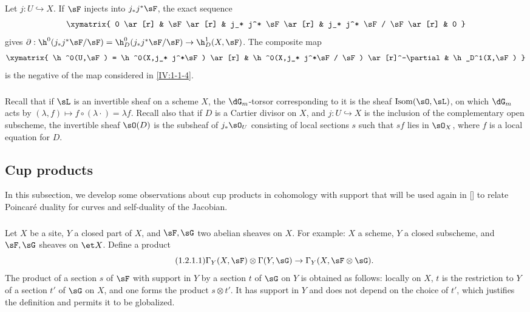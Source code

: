 \marginpar{!}Let $j:U\hookrightarrow X$. If $\sF$ injects into $j_* j^* \sF$, the exact
sequence
\[\xymatrix{
  0 \ar[r]
  & \sF \ar[r]
  & j_* j^* \sF \ar[r]
  & j_* j^* \sF / \sF \ar[r]
  & 0
}\]
gives
$\partial:\h^0(j_* j^*\sF/\sF) = \h_D^0(j_* j^* \sF/\sF) \to \h_D^1(X,\sF)$.
The composite map
\[\xymatrix{
  \h^0(U,\sF) = \h^0(X,j_* j^*\sF) \ar[r]
    & \h^0(X,j_* j^*\sF / \sF) \ar[r]^-\partial
    & \h_D^1(X,\sF)
}\]
is the negative of the map considered in \ref{IV:1-1-4}.






\subsubsection{}\label{IV:1-1-6}

Recall that if $\sL$ is an invertible sheaf on a scheme $X$, the
$\dG_m$-torsor corresponding to it is the sheaf
$\operatorname{Isom}(\sO,\sL)$, on which $\dG_m$ acts by
$(\lambda,f)\mapsto f\circ (\lambda\cdot) = \lambda f$. Recall also that if
$D$ is a Cartier divisor on $X$, and $j:U\hookrightarrow X$ is the inclusion
of the complementary open subscheme, the invertible sheaf $\sO(D)$ is the
subsheaf of $j_*\sO_U$ consisting of local sections $s$ such that $s f$ lies
in $\sO_X$, where $f$ is a local equation for $D$.











\subsection{Cup products}\label{IV:1-2}

In this subsection, we develop some observations about cup products in
cohomology with support that will be used again in [] to relate
Poincaré duality for curves and self-duality of the Jacobian.

\subsubsection{}\label{IV:1-2-1}

Let $X$ be a site, $Y$ a closed part of $X$, and $\sF,\sG$ two abelian
sheaves on $X$. For example: $X$ a scheme, $Y$ a closed subscheme, and
$\sF,\sG$ sheaves on $\et X$. Define a product
\begin{equation*}\tag{1.2.1.1}\label{IV:eq:1-2-1-1}
  \Gamma_Y(X,\sF)\otimes \Gamma(Y,\sG) \to \Gamma_Y(X,\sF\otimes\sG) \text{.}
\end{equation*}
The product of a section $s$ of $\sF$ with support in $Y$ by a section $t$ of
$\sG$ on $Y$ is obtained as follows: locally on $X$, $t$ is the restriction
to $Y$ of a section $t'$ of $\sG$ on $X$, and one forms the product
$s\otimes t'$. It has support in $Y$ and does not depend on the choice of
$t'$, which justifies the definition and permits it to be globalized.


